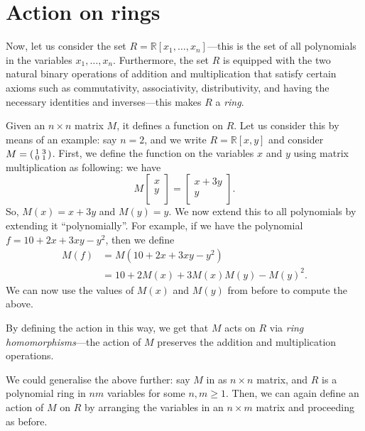 \documentclass[12pt]{article}
\begin{document}
\section{Action on rings}
	
	Now, let us consider the set 
	$R = \mathbb{R}[x_{1}, \ldots, x_{n}]$---this is the set of all polynomials in the variables $x_{1}, \ldots, x_{n}$. 
	Furthermore, the set $R$ is equipped with the two natural binary operations of addition and multiplication that satisfy certain axioms such as commutativity, associativity, distributivity, and having the necessary identities and inverses---this makes $R$ a \emph{ring}. 

	Given an $n \times n$ matrix $M$, it defines a function on $R$. 
	Let us consider this by means of an example: say $n = 2$, and we write $R = \mathbb{R}[x, y]$ and consider $M = \left(\begin{smallmatrix} 1 & 3 \\ 0 & 1 \end{smallmatrix}\right)$. 
	First, we define the function on the variables $x$ and $y$ using matrix multiplication as following: 
	we have
	\begin{equation*} 
		M 
		\begin{bmatrix}
			x \\
			y \\
		\end{bmatrix}
		=
		\begin{bmatrix}
			x + 3y \\
			y \\
		\end{bmatrix}.
	\end{equation*}
	So, $M(x) = x + 3y$ and $M(y) = y$. 
	We now extend this to all polynomials by extending it ``polynomially''. 
	For example, if we have the polynomial 
	$f = 10 + 2 x + 3 x y - y^{2}$, then we define
	\begin{align*} 
		M(f) &= M(10 + 2 x + 3 x y - y^{2}) \\
		&= 10 + 2 M(x) + 3 M(x) M(y) - M(y)^{2}.
	\end{align*}
	We can now use the values of $M(x)$ and $M(y)$ from before to compute the above. 

	By defining the action in this way, we get that $M$ acts on $R$ via \emph{ring homomorphisms}---the action of $M$ preserves the addition and multiplication operations. 

	We could generalise the above further: say $M$ in as $n \times n$ matrix,
	and $R$ is a polynomial ring in $nm$ variables for some $n, m \ge 1$. 
	Then, we can again define an action of $M$ on $R$ by arranging the variables in an $n \times m$ matrix and proceeding as before. 
\end{document}
